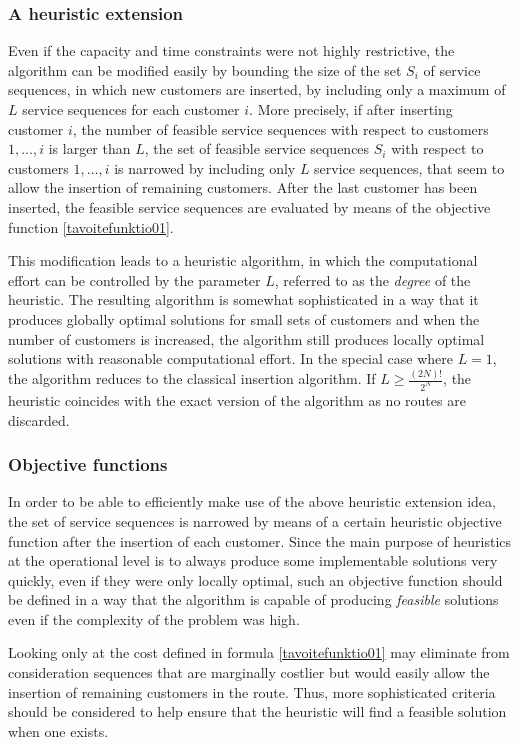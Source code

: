 \documentclass[dissertation,draft*]{aaltoseries}
\begin{document}
\subsubsection{A heuristic extension}
\label{svheuristic}
Even if the capacity and time constraints were not highly restrictive, the algorithm can be 
modified easily by bounding the size of the set $S_i$ 
of service sequences, in which new customers are inserted, 
by including only a maximum of $L$ service sequences
for each customer $i$. More precisely, if after inserting 
customer $i$, the number of feasible service sequences with respect to customers $1,\ldots, i$
is larger than $L$, the set of feasible service sequences $S_i$ with respect to 
customers $1,\ldots, i$ is narrowed by including only $L$  
service sequences, that seem to allow the insertion of remaining customers.
After the last customer has been inserted, the feasible service sequences are evaluated
by means of the objective function \eqref{tavoitefunktio01}.

This modification leads to a heuristic algorithm, in which the computational
effort can be controlled by the parameter $L$, referred to as the \emph{degree} of
the heuristic. The resulting algorithm is
somewhat sophisticated in a way that it produces globally optimal solutions for
small sets of customers and when the number of customers is increased, the
algorithm still produces locally optimal solutions with 
reasonable computational effort. In the special case where $L=1$, the
algorithm reduces to the classical insertion algorithm. 
If $L \geq \frac{(2N)!}{2^N}$, the heuristic coincides with the exact version of the 
algorithm as no routes are discarded.

\subsubsection{Objective functions}
\label{hobjfunc}
In order to be able to efficiently make use of the above heuristic extension
idea, the set of service sequences is narrowed by means of a certain heuristic objective function
after the insertion of each customer.
Since the main purpose of heuristics at the operational level is to always produce some implementable 
solutions very quickly, even if they were only locally optimal, such an objective function should 
be defined in a way that the algorithm is 
capable of producing \emph{feasible} solutions even if the complexity of the problem was high. %

Looking only at the cost defined in formula \eqref{tavoitefunktio01} may eliminate from consideration
sequences that are marginally costlier but would easily allow the
insertion of remaining customers in the route. 
Thus, more sophisticated criteria should be considered to help ensure that the heuristic will
find a feasible solution when one exists.
\end{document}

